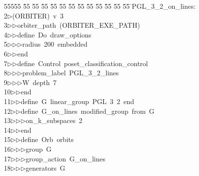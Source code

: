 %
%
\begin{tabbing}
55555 \= 55 \= 55 \= 55 \= 55 \= 55 \= 55 \= 55 \= 55 \= 55 \= 55 \= 55 \= 55 \= \>PGL\_3\_2\_on\_lines:\\[0pt]
2\>$\triangleright$\>(ORBITER)\ v\ 3\ \\[0pt]
3\>$\triangleright$\>$\triangleright$\>orbiter\_path\ (ORBITER\_EXE\_PATH)\ \\[0pt]
4\>$\triangleright$\>$\triangleright$\>define\ Do\ draw\_options\ \\[0pt]
5\>$\triangleright$\>$\triangleright$\>$\triangleright$\>radius\ 200\ embedded\ \\[0pt]
6\>$\triangleright$\>$\triangleright$\>end\ \\[0pt]
7\>$\triangleright$\>$\triangleright$\>define\ Control\ poset\_classification\_control\ \\[0pt]
8\>$\triangleright$\>$\triangleright$\>$\triangleright$\>problem\_label\ PGL\_3\_2\_lines\ \\[0pt]
9\>$\triangleright$\>$\triangleright$\>$\triangleright$\>W\ depth\ 7\ \\[0pt]
10\>$\triangleright$\>$\triangleright$\>end\ \\[0pt]
11\>$\triangleright$\>$\triangleright$\>define\ G\ linear\_group\ PGL\ 3\ 2\ end\ \\[0pt]
12\>$\triangleright$\>$\triangleright$\>define\ G\_on\_lines\ modified\_group\ from\ G\ \\[0pt]
13\>$\triangleright$\>$\triangleright$\>$\triangleright$\>on\_k\_subspaces\ 2\ \\[0pt]
14\>$\triangleright$\>$\triangleright$\>end\ \\[0pt]
15\>$\triangleright$\>$\triangleright$\>define\ Orb\ orbits\ \\[0pt]
16\>$\triangleright$\>$\triangleright$\>$\triangleright$\>group\ G\ \\[0pt]
17\>$\triangleright$\>$\triangleright$\>$\triangleright$\>group\_action\ G\_on\_lines\ \\[0pt]
18\>$\triangleright$\>$\triangleright$\>$\triangleright$\>generators\ G\ \\[0pt]

\end{tabbing}
